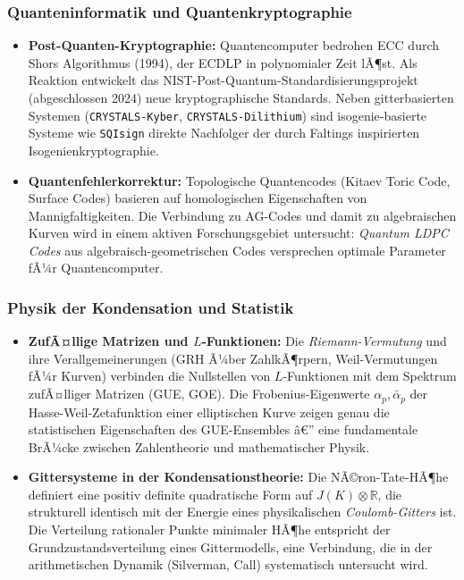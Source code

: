 ﻿\documentclass[12pt,a4paper]{article}
\theoremstyle{plain}
\theoremstyle{definition}
\theoremstyle{remark}
\newcommand{\R}{\mathbb{R}}
\begin{document}
\subsubsection{Quanteninformatik und Quantenkryptographie}

\begin{itemize}[leftmargin=2em,itemsep=4pt]
  \item \textbf{Post-Quanten-Kryptographie:}
    Quantencomputer bedrohen ECC durch Shors Algorithmus (1994), der ECDLP
    in polynomialer Zeit lÃ¶st. Als Reaktion entwickelt das NIST-Post-Quantum-Standardisierungsprojekt
    (abgeschlossen 2024) neue kryptographische Standards. Neben gitterbasierten
    Systemen (\texttt{CRYSTALS-Kyber}, \texttt{CRYSTALS-Dili\newline thium})
    sind isogenie-basierte Systeme wie \texttt{SQIsign} direkte Nachfolger
    der durch Faltings inspirierten Isogenienkryptographie.

  \item \textbf{Quantenfehlerkorrektur:}
    Topologische Quantencodes (Kitaev Toric Code, Surface Codes) basieren auf
    homologischen Eigenschaften von Mannigfaltigkeiten. Die Verbindung zu
    AG-Codes und damit zu algebraischen Kurven wird in einem aktiven Forschungsgebiet
    untersucht: \emph{Quantum LDPC Codes} aus algebraisch-geometrischen Codes
    versprechen optimale Parameter fÃ¼r Quantencomputer.
\end{itemize}

\subsubsection{Physik der Kondensation und Statistik}

\begin{itemize}[leftmargin=2em,itemsep=4pt]
  \item \textbf{ZufÃ¤llige Matrizen und $L$-Funktionen:}
    Die \emph{Riemann-Vermutung} und ihre Verallgemeinerungen (GRH Ã¼ber ZahlkÃ¶rpern,
    Weil-Vermutungen fÃ¼r Kurven) verbinden die Nullstellen von $L$-Funktionen mit
    dem Spektrum zufÃ¤lliger Matrizen (GUE, GOE). Die Frobenius-Eigenwerte
    $\alpha_p, \bar\alpha_p$ der Hasse-Weil-Zetafunktion einer elliptischen Kurve
    zeigen genau die statistischen Eigenschaften des GUE-Ensembles â€” eine
    fundamentale BrÃ¼cke zwischen Zahlentheorie und mathematischer Physik.

  \item \textbf{Gittersysteme in der Kondensationstheorie:}
    Die NÃ©ron-Tate-HÃ¶he definiert eine positiv definite quadratische Form auf
    $J(K) \otimes \R$, die strukturell identisch mit der Energie eines
    physikalischen \emph{Coulomb-Gitters} ist. Die Verteilung rationaler Punkte
    minimaler HÃ¶he entspricht der Grundzustandsverteilung eines Gittermodells,
    eine Verbindung, die in der arithmetischen Dynamik (Silverman, Call) systematisch
    untersucht wird.
\end{itemize}
\end{document}
